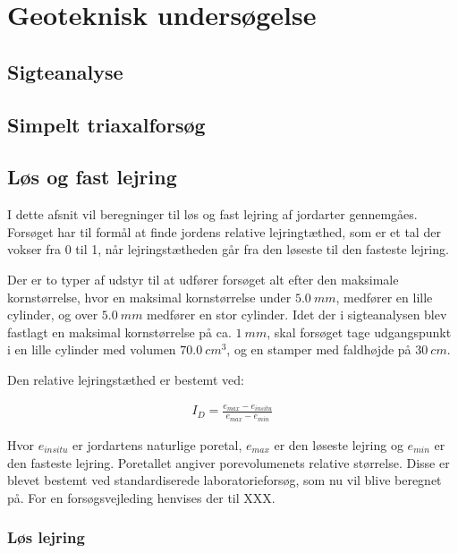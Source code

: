 \chapter{Geoteknisk undersøgelse}


\section{Sigteanalyse}


\section{Simpelt triaxalforsøg}


\section{Løs og fast lejring}


I dette afsnit vil beregninger til løs og fast lejring af jordarter gennemgåes. Forsøget har til formål at finde jordens relative lejringtæthed, som er et tal der vokser fra 0 til 1, når lejringstætheden går fra den løseste til den fasteste lejring.

Der er to typer af udstyr til at udfører forsøget alt efter den maksimale kornstørrelse, hvor en maksimal kornstørrelse under $\SI{5,0}{mm}$, medfører en lille cylinder, og over $\SI{5,0}{mm}$ medfører en stor cylinder. Idet der i sigteanalysen blev fastlagt en maksimal kornstørrelse på ca. $\SI{1}{mm}$,  skal forsøget tage udgangspunkt i en lille cylinder med volumen $\SI{70,0}{cm^{3}}$, og en stamper med faldhøjde på $\SI{30}{cm}$.

Den relative lejringstæthed er bestemt ved:

\begin{align*}
I_{D}=\frac{e_{max}-e_{in situ}}{e_{max}-e_{min}}
\end{align*}



Hvor $e_{in situ}$ er jordartens naturlige poretal, $e_{max}$ er den løseste lejring og $e_{min}$ er den fasteste lejring. Poretallet angiver porevolumenets relative størrelse. Disse er blevet bestemt ved standardiserede laboratorieforsøg, som nu vil blive beregnet på. For en forsøgsvejleding henvises der til XXX.

\subsection{Løs lejring}


